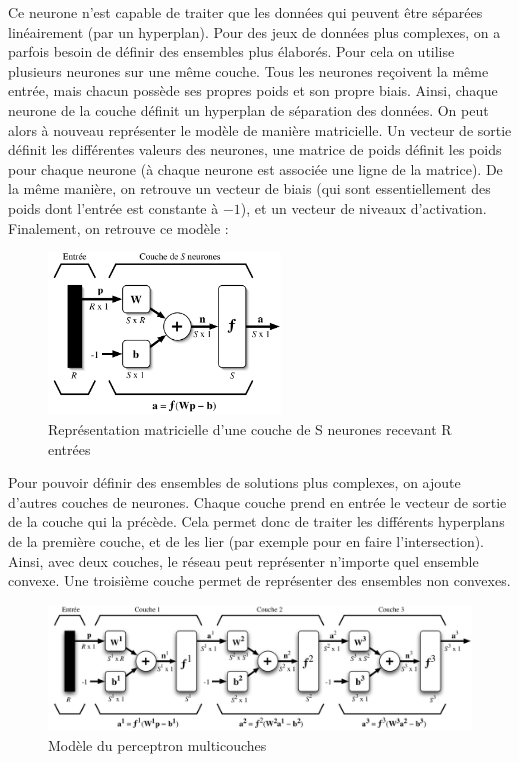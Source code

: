 Ce neurone n'est capable de traiter que les données qui peuvent être séparées linéairement (par un hyperplan). Pour des jeux de données plus complexes,
on a parfois besoin de définir des ensembles plus élaborés.
Pour cela on utilise plusieurs neurones sur une même couche. Tous les neurones reçoivent la même entrée, mais chacun possède ses propres poids et son propre biais.
Ainsi, chaque neurone de la couche définit un hyperplan de séparation des données. On peut alors à nouveau représenter le modèle de manière matricielle.
Un vecteur de sortie définit les différentes valeurs des neurones, une matrice de poids définit les poids pour chaque neurone (à chaque neurone est associée
une ligne de la matrice). De la même manière, on retrouve un vecteur de biais (qui sont essentiellement des poids dont l'entrée est constante à $-1$), et 
un vecteur de niveaux d'activation. Finalement, on retrouve ce modèle : 

\begin{figure}[h]
 \centering
 \includegraphics[width=0.55\textwidth]{img/couche.png}
 \caption[Modèle d'une couche de neurones]{Représentation matricielle d'une couche de S neurones recevant R entrées}
\end{figure}

Pour pouvoir définir des ensembles de solutions plus complexes, on ajoute d'autres couches de neurones. Chaque couche prend en entrée le vecteur de sortie
de la couche qui la précède. Cela permet donc de traiter les différents hyperplans de la première couche, et de les lier (par exemple pour en faire
l'intersection). Ainsi, avec deux couches, le réseau peut représenter n'importe quel ensemble convexe. Une troisième couche permet de représenter des
ensembles non convexes.

\begin{figure}[h]
 \centering
 \includegraphics[width=\textwidth]{img/modele_perceptron_multicouches.png}
 \caption{Modèle du perceptron multicouches}
\end{figure}


